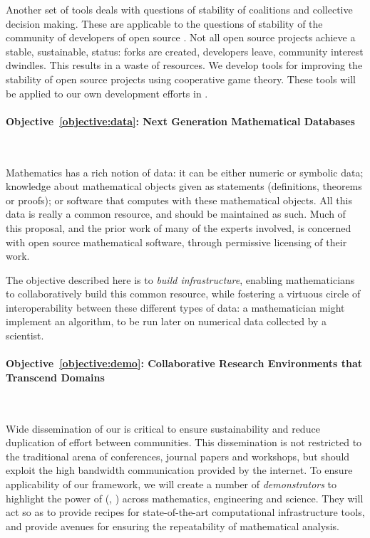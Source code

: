 \documentclass[noworkareas,deliverables,\classoptions]{euproposal}       %
\begin{document}
\begin{proposal}
Another set of tools deals with questions of stability of coalitions
and collective decision making.  These are applicable to the questions
of stability of the community of developers of open source \VREs. Not
all open source projects achieve a stable, sustainable, status: forks
are created, developers leave, community interest dwindles. This
results in a waste of resources.  We develop tools for improving the
stability of open source projects using cooperative game theory. These
tools will be applied to our own development efforts in \TheProject
\VREs.


\paragraph{Objective~\ref{objective:data}: Next Generation Mathematical Databases}\ 

Mathematics has a rich notion of data: it can be either
numeric or symbolic data; knowledge about mathematical objects given as
statements (definitions, theorems or proofs); or software that computes
with these mathematical objects.
%
All this data is really a common resource, and should be maintained as
such. Much of this proposal, and the prior work of many of the experts
involved, is concerned with open source mathematical software, through
permissive licensing of their work.

The objective described here is to \emph{build infrastructure},
enabling mathematicians to collaboratively build this common resource,
while fostering a virtuous circle of interoperability between these
different types of data: a mathematician might implement an
algorithm, to be run later on numerical data collected by a
scientist.

\paragraph{Objective~\ref{objective:demo}: Collaborative Research Environments that Transcend Domains}\ 

Wide dissemination of our \VREs is critical to ensure sustainability
and reduce duplication of effort between communities. This
dissemination is not restricted to the traditional arena of
conferences, journal papers and workshops, but should exploit the high
bandwidth communication provided by the internet. To ensure
applicability of our framework, we will create a number of
\emph{demonstrators} to highlight the power of \TheProject{}
(, ) across mathematics,
engineering and science. They will act so as to provide recipes for
state-of-the-art computational infrastructure tools, and provide
avenues for ensuring the repeatability of mathematical analysis.


\end{proposal}
\end{document}
